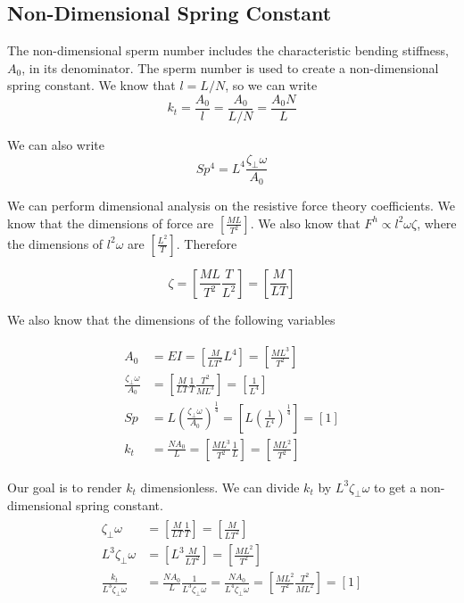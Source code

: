 \documentclass[12pt,letterpaper,titlepage]{article}
\begin{document}
\subsection{Non-Dimensional Spring Constant}
The non-dimensional sperm number includes the characteristic bending stiffness, $A_0$, in its denominator. The sperm number is used to create a non-dimensional spring constant. We know that $l = L/N$, so we can write
\begin{equation}
k_t = \frac{A_0}{l} = \frac{A_0}{L/N} = \frac{A_0 N}{L}
\end{equation}

We can also write
\begin{equation}
Sp^4 = L^4 \frac{\zeta_{\bot} \omega}{A_0}
\end{equation}

We can perform dimensional analysis on the resistive force theory coefficients. We know that the dimensions of force are $[\frac{ML}{T^2}]$. We also know that $F^h \propto l^2 \omega \zeta$, where the dimensions of $l^2 \omega$ are $[\frac{L^2}{T}]$. Therefore

\begin{equation}
\zeta = [\frac{ML}{T^2} \frac{T}{L^2} ] = [\frac{M}{LT}]
\end{equation}

We also know that the dimensions of the following variables

\begin{align}
\begin{split}
A_0 &= EI = [\frac{M}{LT^2} L^4] = [\frac{ML^3}{T^2}] \\
\frac{\zeta_{\bot} \omega}{A_0} &= [\frac{M}{LT} \frac{1}{T} \frac{T^2}{ML^3}] = [\frac{1}{L^4}] \\
Sp &= L (\frac{\zeta_{\bot} \omega}{A_0})^{\frac{1}{4}} = [L (\frac{1}{L^4})^{\frac{1}{4}}] = [1] \\
k_t &= \frac{NA_0}{L} = [\frac{ML^3}{T^2} \frac{1}{L}] = [\frac{ML^2}{T^2}]
\end{split}
\end{align}

Our goal is to render $k_t$ dimensionless. We can divide $k_t$ by $L^3 \zeta_{\bot} \omega$ to get a non-dimensional spring constant.
\begin{align}
\begin{split}
\zeta_{\bot} \omega &= [\frac{M}{LT} \frac{1}{T}] = [\frac{M}{LT^2}] \\
L^3 \zeta_{\bot} \omega &= [L^3 \frac{M}{LT^2}] = [\frac{ML^2}{T^2}] \\
\frac{k_t}{L^3 \zeta_{\bot} \omega} &= \frac{NA_0}{L} \frac{1}{L^3 \zeta_{\bot} \omega} = \frac{NA_0}{L^4 \zeta_{\bot} \omega} = [\frac{ML^2}{T^2} \frac{T^2}{ML^2}] = [1]
\end{split}
\end{align}
\end{document}
